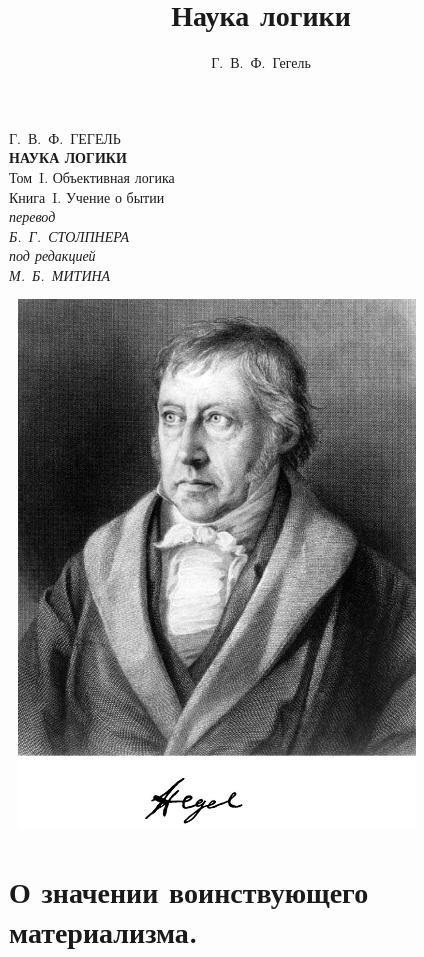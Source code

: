\documentclass[b5paper, 11pt, twoside, onecolumn, openany]{memoir}
\author{Г.~В.~Ф.~Гегель}
\title{Наука логики}
\date{}
\begin{document}
\frontmatter
\pagestyle{empty}

{\centering
  {\Large Г.~В.~Ф.~ГЕГЕЛЬ} \\
  \vspace{130pt}
  \textbf{\Huge НАУКА ЛОГИКИ} \\
  \vspace{12pt}
  {\Large Том~I. Объективная логика} \\
  \vspace{8pt}
  {\large Книга~I. Учение о бытии} \\
  \vspace{45pt}
  \textit{перевод} \\
  \textit{Б.~Г.~СТОЛПНЕРА} \\
  \vspace{10pt}
  \textit{под редакцией} \\
  \textit{М.~Б.~МИТИНА}
\par}

\clearpage

\begin{center}
\includegraphics[width=11cm,height=14cm]{hegel-img001.png}
\end{center}

\part[О значении воинствующего материализма.]{О значении воинствующего материализма.}
\pagestyle{plain}
\setcounter{page}{1}

\end{document}
